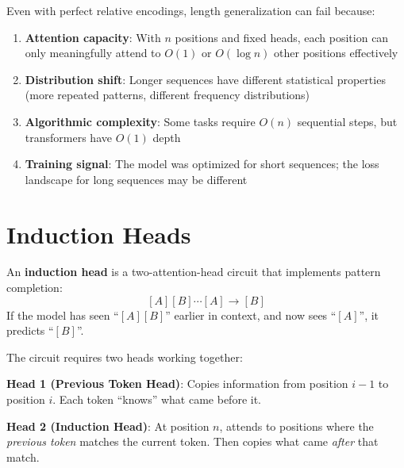 \begin{remark}
    Even with perfect relative encodings, length generalization can fail because:
    \begin{enumerate}
        \item \textbf{Attention capacity}: With $n$ positions and fixed heads, each position can only meaningfully attend to $O(1)$ or $O(\log n)$ other positions effectively
        \item \textbf{Distribution shift}: Longer sequences have different statistical properties (more repeated patterns, different frequency distributions)
        \item \textbf{Algorithmic complexity}: Some tasks require $O(n)$ sequential steps, but transformers have $O(1)$ depth
        \item \textbf{Training signal}: The model was optimized for short sequences; the loss landscape for long sequences may be different
    \end{enumerate}
\end{remark}

\section{Induction Heads}

\begin{definition}
    An \textbf{induction head} is a two-attention-head circuit that implements pattern completion:
    \[
        [A][B] \cdots [A] \to [B]
    \]
    If the model has seen ``$[A][B]$'' earlier in context, and now sees ``$[A]$'', it predicts ``$[B]$''.
\end{definition}

\begin{remark}
    The circuit requires two heads working together:

    \textbf{Head 1 (Previous Token Head)}: Copies information from position $i-1$ to position $i$. Each token ``knows'' what came before it.

    \textbf{Head 2 (Induction Head)}: At position $n$, attends to positions where the \emph{previous token} matches the current token. Then copies what came \emph{after} that match.
\end{remark}

